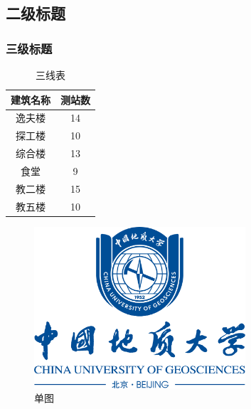 \documentclass[12pt,a4paper,AutoFakeBold]{ctexart}
\begin{document}
\subsection{二级标题}

\subsubsection{三级标题}

\begin{table}[H]
    \centering
    \caption{\label{tab}三线表}
    \begin{tabular}{cc}
        \toprule
        建筑名称 & 测站数 \\
        \midrule
        逸夫楼   & 14     \\
        探工楼   & 10     \\
        综合楼   & 13     \\
        食堂     & 9      \\
        教二楼   & 15     \\
        教五楼   & 10     \\
        \bottomrule
    \end{tabular}
\end{table}

\begin{figure}[H]
    \centering
    \includegraphics[width=0.7\textwidth]{校徽与中英文（蓝色中轴式）.png}
    \caption{\label{fig:yif_std}单图}
\end{figure}
\end{document}
